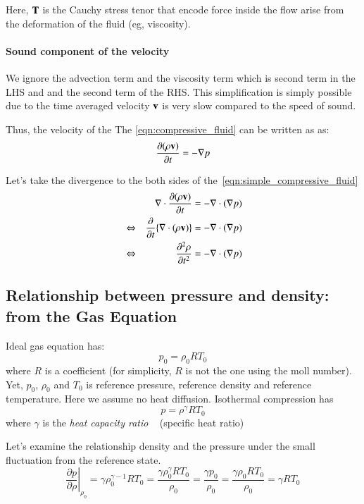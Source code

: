 Here, $\mathbf{T}$ is the Cauchy stress tenor that encode force inside the flow arise from the deformation of the fluid (eg, viscosity).


\paragraph{Sound component of the velocity}
We ignore the advection term and the viscosity term which is second term in the LHS and and the second term of the RHS.
%
This simplification is simply possible due to the time averaged velocity $\mathbf{v}$ is very slow compared to the speed of sound.

Thus, the velocity of the
%
The \eqref{eqn:compressive_fluid} can be written as as:
%
\begin{equation}
\frac{\partial (\rho \mathbf{v})}{\partial t} = -\nabla p
\label{eqn:simple_compressive_fluid}
\end{equation}
%

Let's take the divergence to the both sides of the~\eqref{eqn:simple_compressive_fluid}
%
\begin{eqnarray}
&& \nabla\cdot\frac{\partial (\rho \mathbf{v})}{\partial t} =-\nabla\cdot(\nabla p)\\
&\Leftrightarrow& \frac{\partial}{\partial t}\{\nabla\cdot(\rho\mathbf{v})\} = -\nabla\cdot(\nabla p)\\
&\Leftrightarrow& \frac{\partial^2 \rho}{\partial t^2} = -\nabla\cdot(\nabla p)
\end{eqnarray}


\subsection{Relationship between pressure and density: from the Gas Equation}
%
Ideal gas equation has:
\begin{equation}
p_0=\rho_0 RT_0
\end{equation}
%
where $R$ is a coefficient (for simplicity, $R$ is not the one using the moll number).
%
Yet, $p_0$, $\rho_0$ and $T_0$ is reference pressure, reference density and reference temperature.
%
Here we assume no heat diffusion. Isothermal compression has
%
\begin{equation}
p = \rho^\gamma RT_0
\end{equation}
%
where $\gamma$ is the \textit{heat capacity ratio} ~ (specific heat ratio)

%
Let's examine the relationship density and the pressure under the small fluctuation from the reference state.
%
\begin{equation}
\left.\frac{\partial p}{\partial \rho}\right|_{\rho_0} = \gamma \rho^{\gamma-1}_0 RT_0 =\frac{\gamma\rho^{\gamma}_0 RT_0}{\rho_0} = \frac{\gamma p_0}{\rho_0} = \frac{\gamma\rho_0 RT_0}{\rho_0} = \gamma RT_0
\label{eqn:pressure_density_flucturation}
\end{equation}



